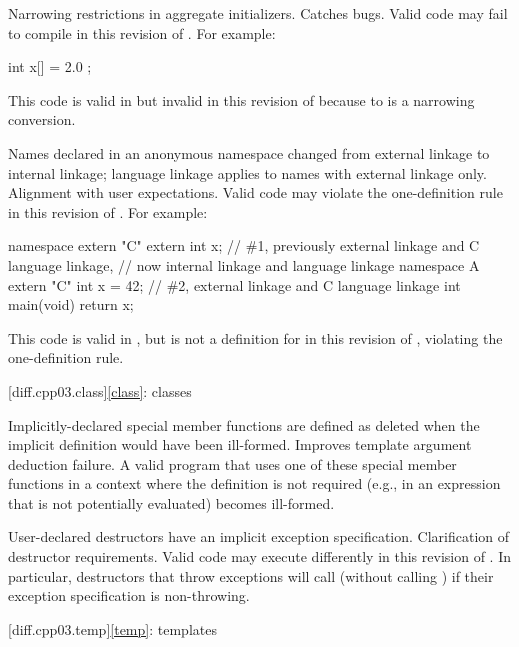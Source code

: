 \change
Narrowing restrictions in aggregate initializers.
\rationale
Catches bugs.
\effect
Valid \CppIII{} code may fail to compile in this revision of \Cpp{}.
For example:
\begin{codeblock}
int x[] = { 2.0 };
\end{codeblock}
This code is valid in \CppIII{} but invalid in this
revision of \Cpp{} because  to  is a narrowing
conversion.

\change
Names declared in an anonymous namespace
changed from external linkage to internal linkage;
language linkage applies to names with external linkage only.
\rationale
Alignment with user expectations.
\effect
Valid \CppIII{} code may violate the one-definition rule
in this revision of \Cpp{}.
For example:
\begin{codeblock}
namespace { extern "C" { extern int x; } }  // \#1, previously external linkage and C language linkage,
                                            // now internal linkage and \Cpp{} language linkage
namespace A { extern "C" int x = 42; }      // \#2, external linkage and C language linkage
int main(void) { return x; }
\end{codeblock}
This code is valid in \CppIII{},
but  is not a definition for 
in this revision of \Cpp{}, violating the one-definition rule.

[diff.cpp03.class]{\ref{class}: classes}

\change
Implicitly-declared special member functions are defined as deleted
when the implicit definition would have been ill-formed.
\rationale
Improves template argument deduction failure.
\effect
A valid \CppIII{} program that uses one of these special member functions in a
context where the definition is not required (e.g., in an expression that is
not potentially evaluated) becomes ill-formed.

\change
User-declared destructors have an implicit exception specification.
\rationale
Clarification of destructor requirements.
\effect
Valid \CppIII{} code may execute differently in this revision of \Cpp{}. In
particular, destructors that throw exceptions will call 
(without calling ) if their exception specification is
non-throwing.

[diff.cpp03.temp]{\ref{temp}: templates}

